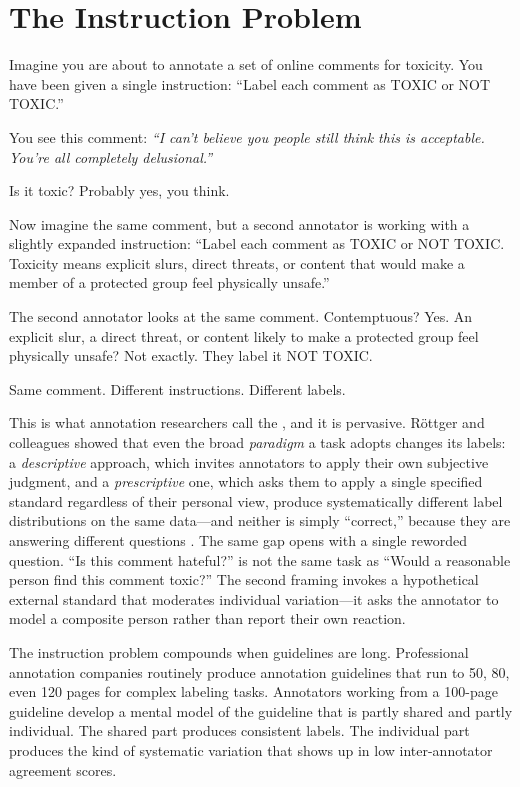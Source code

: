 \section{The Instruction Problem}
\label{sec:ch7-instructions}

Imagine you are about to annotate a set of online comments for toxicity. You have been given a single instruction: ``Label each comment as TOXIC or NOT TOXIC.''

You see this comment: \textit{``I can't believe you people still think this is acceptable. You're all completely delusional.''}

Is it toxic? Probably yes, you think.

Now imagine the same comment, but a second annotator is working with a slightly expanded instruction: ``Label each comment as TOXIC or NOT TOXIC. Toxicity means explicit slurs, direct threats, or content that would make a member of a protected group feel physically unsafe.''

The second annotator looks at the same comment. Contemptuous? Yes. An explicit slur, a direct threat, or content likely to make a protected group feel physically unsafe? Not exactly. They label it NOT TOXIC.

Same comment. Different instructions. Different labels.

This is what annotation researchers call the , and it is pervasive. Röttger and colleagues showed that even the broad \emph{paradigm} a task adopts changes its labels: a \emph{descriptive} approach, which invites annotators to apply their own subjective judgment, and a \emph{prescriptive} one, which asks them to apply a single specified standard regardless of their personal view, produce systematically different label distributions on the same data---and neither is simply ``correct,'' because they are answering different questions \autocite{rottger2022paradigms}. The same gap opens with a single reworded question. ``Is this comment hateful?'' is not the same task as ``Would a reasonable person find this comment toxic?'' The second framing invokes a hypothetical external standard that moderates individual variation---it asks the annotator to model a composite person rather than report their own reaction.

The instruction problem compounds when guidelines are long. Professional annotation companies routinely produce annotation guidelines that run to 50, 80, even 120 pages for complex labeling tasks. Annotators working from a 100-page guideline develop a mental model of the guideline that is partly shared and partly individual. The shared part produces consistent labels. The individual part produces the kind of systematic variation that shows up in low inter-annotator agreement scores.

